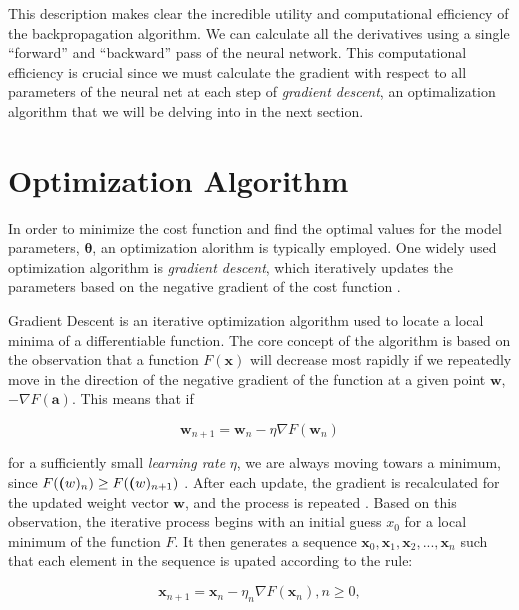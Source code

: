 \documentclass[a4paper, UKenglish, 11pt]{uiomaster}
\begin{document}
This description makes clear the incredible utility and computational efficiency of the backpropagation algorithm. We can calculate all the derivatives using a single “forward” and “backward” pass of the neural network. This computational efficiency is crucial since we must calculate the gradient with respect to all parameters of the neural net at each step of \emph{gradient descent}, an optimalization algorithm that we will be delving into in the next section.

\section{Optimization Algorithm}
In order to minimize the cost function and find the optimal values for the model parameters, $\boldsymbol{\theta}$, an optimization alorithm is typically employed. One widely used optimization algorithm is \emph{gradient descent}, which iteratively updates the parameters based on the negative gradient of the cost function \cite{mehta2019high}.

Gradient Descent is an iterative optimization algorithm used to locate a local minima of a differentiable function. The core concept of the algorithm is based on the observation that a function $F(\textbf{x})$ will decrease most rapidly if we repeatedly move in the direction of the negative gradient of the function at a given point $\textbf{w}$, $-\nabla F(\textbf{a})$. This means that if

\begin{equation}
\textbf{w}_{n+1} = \textbf{w}_n - \eta\nabla F(\textbf{w}_n)
\end{equation}

for a sufficiently small \emph{learning rate} $\eta$, we are always moving towars a minimum, since $F(\textbf(w)_n) \ge F(\textbf(w)_{n+1})$ \cite{wiki-gradient-descent}. After each update, the gradient is recalculated for the updated weight vector $\textbf{w}$, and the process is repeated \cite{bishop2006pattern}. Based on this observation, the iterative process begins with an initial guess $x_0$ for a local minimum of the function $F$. It then generates a sequence $\textbf{x}_0, \textbf{x}_1, \textbf{x}_2, ..., \textbf{x}_n$ such that each element in the sequence is upated according to the rule:

\begin{equation}
\textbf{x}_{n+1} = \textbf{x}_{n} - \eta_n\nabla F(\textbf{x}_n), n \ge 0,
\end{equation}
\end{document}
